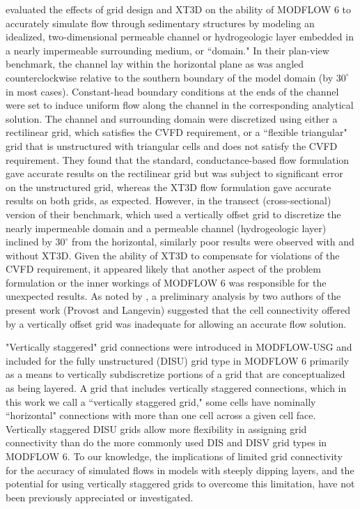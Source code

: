 \documentclass{article}
\begin{document}
\cite{bardot2022} evaluated the effects of grid design and XT3D on the ability of MODFLOW 6 to accurately simulate flow through sedimentary structures by modeling an idealized, two-dimensional permeable channel or hydrogeologic layer embedded in a nearly impermeable surrounding medium, or ``domain." In their plan-view benchmark, the channel lay within the horizontal plane as was angled counterclockwise relative to the southern boundary of the model domain (by $30^{\circ}$ in most cases). Constant-head boundary conditions at the ends of the channel were set to induce uniform flow along the channel in the corresponding analytical solution. The channel and surrounding domain were discretized using either a rectilinear grid, which satisfies the CVFD requirement, or a ``flexible triangular" grid that is unstructured with triangular cells and does not satisfy the CVFD requirement. They found that the standard, conductance-based flow formulation gave accurate results on the rectilinear grid but was subject to significant error on the unstructured grid, whereas the XT3D flow formulation gave accurate results on both grids, as expected. However, in the transect (cross-sectional) version of their benchmark, which used a vertically offset grid to discretize the nearly impermeable domain and a permeable channel (hydrogeologic layer) inclined by $30^{\circ}$ from the horizontal, similarly poor results were observed with and without XT3D. Given the ability of XT3D to compensate for violations of the CVFD requirement, it appeared likely that another aspect of the problem formulation or the inner workings of MODFLOW 6 was responsible for the unexpected results. As noted by \cite{bardot2022}, a preliminary analysis by two authors of the present work (Provost and Langevin) suggested that the cell connectivity offered by a vertically offset grid was inadequate for allowing an accurate flow solution. 

"Vertically staggered" grid connections were introduced in MODFLOW-USG \citep{modflowusg} and included for the fully unstructured (DISU) grid type in MODFLOW 6 \citep{modflow6gwf} primarily as a means to vertically subdiscretize portions of a grid that are conceptualized as being layered. A grid that includes vertically staggered connections, which in this work we call a ``vertically staggered grid," some cells have nominally ``horizontal" connections with more than one cell across a given cell face. Vertically staggered DISU grids allow more flexibility in assigning grid connectivity than do the more commonly used DIS and DISV grid types \citep{modflow6gwf} in MODFLOW 6. To our knowledge, the implications of limited grid connectivity for the accuracy of simulated flows in models with steeply dipping layers, and the potential for using vertically staggered grids to overcome this limitation, have not been previously appreciated or investigated.
\end{document}
